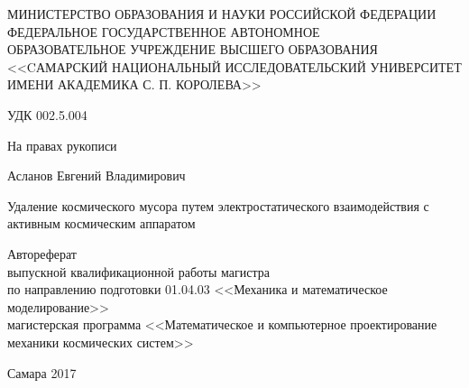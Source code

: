 \begin{titlepage}

\begin{center}
\vspace{1.5em}
\small{МИНИСТЕРСТВО ОБРАЗОВАНИЯ И НАУКИ РОССИЙСКОЙ ФЕДЕРАЦИИ\\
\vspace{\baselineskip}
ФЕДЕРАЛЬНОЕ ГОСУДАРСТВЕННОЕ АВТОНОМНОЕ\\
ОБРАЗОВАТЕЛЬНОЕ УЧРЕЖДЕНИЕ ВЫСШЕГО ОБРАЗОВАНИЯ\\
<<CАМАРСКИЙ НАЦИОНАЛЬНЫЙ ИССЛЕДОВАТЕЛЬСКИЙ УНИВЕРСИТЕТ\\
ИМЕНИ АКАДЕМИКА С. П. КОРОЛЕВА>>\\}
\vspace{\baselineskip}
\end{center}

\begin{minipage}{.45\linewidth}
	\begin{flushleft}                           
	\small{УДК 002.5.004}
	\end{flushleft} 
\end{minipage}
\hfill
\begin{minipage}{.45\linewidth}
	\begin{flushright}                
	\small{На правах рукописи}
	\end{flushright} 
\end{minipage}

\vspace{3em}

\begin{center}
	Асланов Евгений Владимирович
\end{center}

\begin{center}
Удаление космического мусора путем электростатического взаимодействия с активным космическим аппаратом
\end{center}

\vspace{3em}

\begin{center}
\small{Автореферат\\
выпускной квалификационной работы магистра\\
по направлению подготовки 01.04.03 <<Механика и математическое моделирование>>\\
магистерская программа <<Математическое и компьютерное проектирование механики космических систем>>}
\end{center}

\vspace{\fill}

\begin{center}
Самара 2017
\end{center}
\end{titlepage}
\newpage

